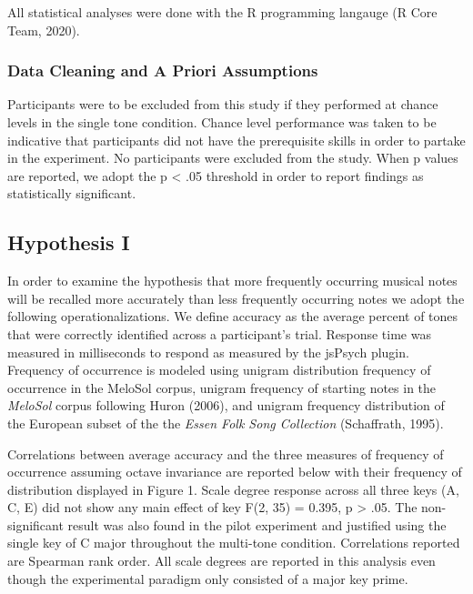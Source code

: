 \documentclass[english,man,floatsintext]{apa6}
\begin{document}
All statistical analyses were done with the R programming langauge (R Core Team, 2020).

\hypertarget{data-cleaning-and-a-priori-assumptions}{%
\subsubsection{Data Cleaning and A Priori Assumptions}\label{data-cleaning-and-a-priori-assumptions}}

Participants were to be excluded from this study if they performed at chance levels in the single tone condition.
Chance level performance was taken to be indicative that participants did not have the prerequisite skills in order to partake in the experiment.
No participants were excluded from the study.
When p values are reported, we adopt the p \textless{} .05 threshold in order to report findings as statistically significant.

\hypertarget{hypothesis-i}{%
\subsection{Hypothesis I}\label{hypothesis-i}}

In order to examine the hypothesis that more frequently occurring musical notes will be recalled more accurately than less frequently occurring notes we adopt the following operationalizations.
We define accuracy as the average percent of tones that were correctly identified across a participant's trial.
Response time was measured in milliseconds to respond as measured by the jsPsych plugin.
Frequency of occurrence is modeled using unigram distribution frequency of occurrence in the MeloSol corpus, unigram frequency of starting notes in the \emph{MeloSol} corpus following Huron (2006), and unigram frequency distribution of the European subset of the the \emph{Essen Folk Song Collection} (Schaffrath, 1995).

Correlations between average accuracy and the three measures of frequency of occurrence assuming octave invariance are reported below with their frequency of distribution displayed in Figure 1.
Scale degree response across all three keys (A, C, E) did not show any main effect of key F(2, 35) = 0.395, p \textgreater{} .05.
The non-significant result was also found in the pilot experiment and justified using the single key of C major throughout the multi-tone condition.
Correlations reported are Spearman rank order.
All scale degrees are reported in this analysis even though the experimental paradigm only consisted of a major key prime.
\end{document}
